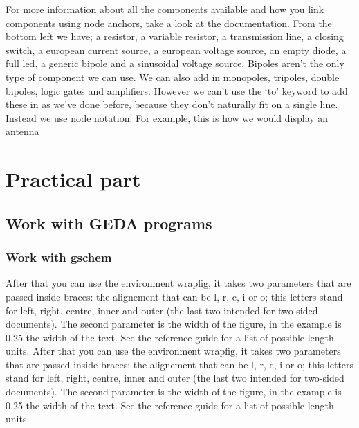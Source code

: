 \documentclass{report}
\begin{document}
For more information about all the components available and how you link components using node anchors, take a look at the documentation. From the bottom left we have; a resistor, a variable resistor, a transmission line, a closing switch, a european current source, a european voltage source, an empty diode, a full led, a generic bipole and a sinusoidal voltage source. Bipoles aren’t the only type of component we can use. We can also add in monopoles, tripoles, double bipoles, logic gates and amplifiers. However we can’t use the ‘to’ keyword to add these in as we’ve done before, because they don’t naturally fit on a single line. Instead we use node notation. For example, this is how we would display an antenna \cite{secondRef}
 
 
 
 
 \chapter{Practical part}
\section{Work with GEDA programs} 
\subsection{Work with gschem}
 After that you can use the environment wrapfig, it takes two parameters that are passed inside braces: the alignement that can be l, r, c, i or o; this letters stand for left, right, centre, inner and outer (the last two intended for two-sided documents). The second parameter is the width of the figure, in the example is 0.25 the width of the text. See the reference guide for a list of possible length units.
 After that you can use the environment wrapfig, it takes two parameters that are passed inside braces: the alignement that can be l, r, c, i or o; this letters stand for left, right, centre, inner and outer (the last two intended for two-sided documents). The second parameter is the width of the figure, in the example is 0.25 the width of the text. See the reference guide for a list of possible length units.
 
\end{document}
